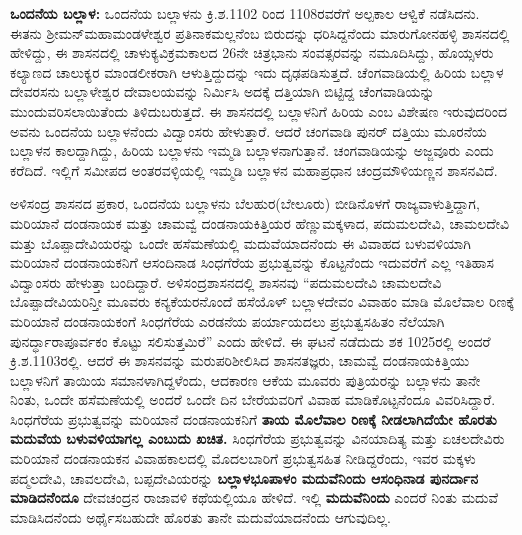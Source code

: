 \textbf{ಒಂದನೆಯ ಬಲ್ಲಾಳ:} ಒಂದನೆಯ ಬಲ್ಲಾಳನು ಕ್ರಿ.ಶ.1102 ರಿಂದ 1108ರವರೆಗೆ ಅಲ್ಪಕಾಲ ಆಳ್ವಿಕೆ ನಡೆಸಿದನು. ಈತನು ಶ‍್ರೀಮನ್​ಮಹಾಮಂಡಳೇಶ್ವರ ಪ್ರತಿನಾಕಮಲ್ಲನೆಂಬ ಬಿರುದನ್ನು ಧರಿಸಿದ್ದನೆಂದು ಮಾರುಗೋನಹಳ್ಳಿ ಶಾಸನದಲ್ಲಿ ಹೇಳಿದ್ದು, ಈ ಶಾಸನದಲ್ಲಿ ಚಾಳುಕ್ಯವಿಕ್ರಮ\-ಕಾಲದ 26ನೇ ಚಿತ್ರಭಾನು ಸಂವತ್ಸರವನ್ನು ನಮೂದಿಸಿದ್ದು, ಹೊಯ್ಸಳರು ಕಲ್ಯಾಣದ ಚಾಲುಕ್ಯರ ಮಾಂಡಲೀಕರಾಗಿ ಆಳುತ್ತಿದ್ದುದನ್ನು ಇದು ದೃಢಪಡಿಸುತ್ತದೆ. ಚೆಂಗವಾಡಿಯಲ್ಲಿ ಹಿರಿಯ ಬಲ್ಲಾಳ ದೇವರಸನು ಬಲ್ಲಾಳೇಶ್ವರ ದೇವಾಲಯವನ್ನು ನಿರ್ಮಿಸಿ ಅದಕ್ಕೆ ದತ್ತಿಯಾಗಿ ಬಿಟ್ಟಿದ್ದ ಚೆಂಗವಾಡಿಯನ್ನು ಮುಂದುವರಿಸಲಾಯಿತೆಂದು ತಿಳಿದುಬರುತ್ತದೆ. ಈ ಶಾಸನದಲ್ಲಿ ಬಲ್ಲಾಳನಿಗೆ ಹಿರಿಯ ಎಂಬ ವಿಶೇಷಣ ಇರುವುದರಿಂದ ಅವನು ಒಂದನೆಯ ಬಲ್ಲಾಳನೆಂದು ವಿದ್ವಾಂಸರು ಹೇಳುತ್ತಾರೆ. ಆದರೆ ಚಂಗವಾಡಿ ಪುನರ್​ ದತ್ತಿಯು ಮೂರನೆಯ ಬಲ್ಲಾಳನ ಕಾಲದ್ದಾಗಿದ್ದು, ಹಿರಿಯ ಬಲ್ಲಾಳನು ಇಮ್ಮಡಿ ಬಲ್ಲಾಳನಾಗುತ್ತಾನೆ. ಚಂಗವಾಡಿಯನ್ನು ಅಜ್ಜವೂರು ಎಂದು ಕರೆದಿದೆ. ಇಲ್ಲಿಗೆ ಸಮೀಪದ ಅಂತರವಳ್ಳಿಯಲ್ಲಿ ಇಮ್ಮಡಿ ಬಲ್ಲಾಳನ ಮಹಾಪ್ರಧಾನ ಚಂದ್ರಮೌಳಿಯಣ್ಣನ ಶಾಸನವಿದೆ.

ಅಳಿಸಂದ್ರ ಶಾಸನದ ಪ್ರಕಾರ, ಒಂದನೆಯ ಬಲ್ಲಾಳನು ಬೆಲಹುರ(ಬೇಲೂರು) ಬೀಡಿನೊಳಗೆ ರಾಜ್ಯವಾಳುತ್ತಿದ್ದಾಗ, ಮರಿಯಾನೆ ದಂಡನಾಯಕ ಮತ್ತು ಚಾಮವ್ವೆ ದಂಡನಾಯಕಿತ್ತಿಯರ ಹೆಣ್ಣುಮಕ್ಕಳಾದ, ಪದುಮಲದೇವಿ, ಚಾಮಲದೇವಿ ಮತ್ತು ಬೊಪ್ಪಾದೇವಿಯರನ್ನು ಒಂದೇ ಹಸೆಮಣೆಯಲ್ಲಿ ಮದುವೆಯಾದನೆಂದು ಈ ವಿವಾಹದ ಬಳುವಳಿಯಾಗಿ ಮರಿಯಾನೆ ದಂಡನಾಯಕನಿಗೆ ಆಸಂದಿನಾಡ ಸಿಂಧಗೆರೆಯ ಪ್ರಭುತ್ವವನ್ನು ಕೊಟ್ಟನೆಂದು ಇದುವರೆಗೆ ಎಲ್ಲ ಇತಿಹಾಸ ವಿದ್ವಾಂಸರು ಹೇಳುತ್ತಾ ಬಂದಿದ್ದಾರೆ. ಅಳಿಸಂದ್ರಶಾಸನದಲ್ಲಿ ಶಾಸನವು “ಪದುಮಲದೇವಿ ಚಾಮಲದೇವಿ ಬೊಪ್ಪಾದೇವಿಯರಿನ್ತೀ ಮೂವರು ಕನ್ಯಕೆಯರನೊಂದೆ ಹಸೆಯೊಳ್​ ಬಲ್ಲಾಳದೇವಂ ವಿವಾಹಂ ಮಾಡಿ ಮೊಲೆವಾಲ ರಿಣಕ್ಕೆ ಮರಿಯಾನೆ ದಂಡನಾಯಕಂಗೆ ಸಿಂಧಗೆರೆಯ ಎರಡನೆಯ ಪರ್ಯಾಯದಲು ಪ್ರಭುತ್ವಸಹಿತಂ ನೆಲೆಯಾಗಿ ಪುನರ್ದ್ಧಾರಾಪೂರ್ವಕಂ ಕೊಟ್ಟು ಸಲಿಸುತ್ತಮಿರೆ” ಎಂದು ಹೇಳಿದೆ. ಈ ಘಟನೆ ನಡೆದುದು ಶಕ 1025ರಲ್ಲಿ ಅಂದರೆ ಕ್ರಿ.ಶ.1103ರಲ್ಲಿ. ಆದರೆ ಈ ಶಾಸನವನ್ನು ಮರುಪರಿಶೀಲಿಸಿದ ಶಾಸನತಜ್ಞರು, ಚಾಮವ್ವೆ ದಂಡನಾಯಕಿತ್ತಿಯು ಬಲ್ಲಾಳನಿಗೆ ತಾಯಿಯ ಸಮಾನಳಾಗಿದ್ದಳೆಂದು, ಆದಕಾರಣ ಆಕೆಯ ಮೂವರು ಪುತ್ರಿಯರನ್ನು ಬಲ್ಲಾಳನು ತಾನೇ ನಿಂತು, ಒಂದೇ ಹಸೆಮಣೆಯಲ್ಲಿ ಅಂದರೆ ಒಂದೇ ದಿನ ಬೇರೆಯವರಿಗೆ ವಿವಾಹ ಮಾಡಿಕೊಟ್ಟನೆಂದೂ ವಿವರಿಸಿದ್ದಾರೆ. ಸಿಂಧಗೆರೆಯ ಪ್ರಭುತ್ವವನ್ನು ಮರಿಯಾನೆ ದಂಡನಾಯಕನಿಗೆ \textbf{ತಾಯ ಮೊಲೆವಾಲ ರಿಣಕ್ಕೆ ನೀಡಲಾಗಿದೆಯೇ ಹೊರತು ಮದುವೆಯ ಬಳುವಳಿಯಾಗಲ್ಲ ಎಂಬುದು ಖಚಿತ. }ಸಿಂಧಗೆರೆಯ ಪ್ರಭುತ್ವವನ್ನು ವಿನಯಾದಿತ್ಯ ಮತ್ತು ಏಚಲದೇವಿರು ಮರಿಯಾನೆ ದಂಡನಾಯಕನ ವಿವಾಹಕಾಲದಲ್ಲಿ ಮೊದಲಬಾರಿಗೆ ಪ್ರಭುತ್ವಸಹಿತ ನೀಡಿದ್ದರೆಂದು, ಇವರ ಮಕ್ಕಳು ಪದ್ಮಲದೇವಿ, ಚಾವಲದೇವಿ, ಬಪ್ಪದೇವಿಯರನ್ನು \textbf{ಬಲ್ಲಾಳಭೂಪಾಳಂ ಮದುವೆನಿಂದು ಆಸಂಧಿನಾಡ ಪುನರ್ದಾನ ಮಾಡಿದನೆಂದೂ} ದೇವಚಂದ್ರನ ರಾಜಾವಳಿ ಕಥೆಯಲ್ಲಿಯೂ ಹೇಳಿದೆ. ಇಲ್ಲಿ \textbf{ಮದುವೆನಿಂದು} ಎಂದರೆ ನಿಂತು ಮದುವೆ ಮಾಡಿಸಿದನೆಂದು ಅರ್ಥೈಸಬಹುದೇ ಹೊರತು ತಾನೇ ಮದುವೆಯಾದನೆಂದು ಆಗುವುದಿಲ್ಲ.

